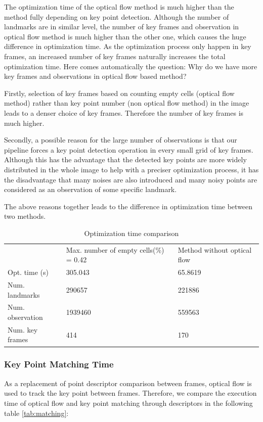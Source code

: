 \documentclass[conference]{IEEEtran}
\begin{document}
The optimization time of the optical flow method is much higher than the method fully depending on key point detection. Although the number of landmarks are in similar level, the number of key frames and observation in optical flow method is much higher than the other one, which causes the huge difference in optimization time. As the optimization process only happen in key frames, an increased number of key frames naturally increases the total optimization time. Here comes automatically the question: Why do we have more key frames and observations in optical flow based method?

Firstly, selection of key frames based on counting empty cells (optical flow method) rather than key point number (non optical flow method) in the image leads to a denser choice of key frames. Therefore the number of key frames is much higher.

Secondly, a possible reason for the large number of observations is that our pipeline forces a key point detection operation in every small grid of key frames. Although this has the advantage that the detected key points are more widely distributed in the whole image to help with a preciser optimization process, it has the disadvantage that many noises are also introduced and many noisy points are considered as an observation of some specific landmark.  

The above reasons together leads to the difference in optimization time between two methods.

\begin{table}
	\centering
	\caption{Optimization time comparison}
	\label{tab:optimization}
	\begin{tabular}{lll}
		  & Max. number of empty cells(\%) = 0.42 & Method without optical flow   \\
		Opt. time (s)  & 305.043 & 65.8619\\
		Num. landmarks &290657 &221886\\
		 Num. observation & 1939460 & 559563 \\        
		 Num. key frames & 414 & 170                 
	\end{tabular}
\end{table}


\subsubsection{Key Point Matching Time}
As a replacement of point descriptor comparison between frames, optical flow is used to track the key point between frames. Therefore, we compare the execution time of optical flow and key point matching through descriptors in the following table \ref{tab:matching}:
\end{document}
